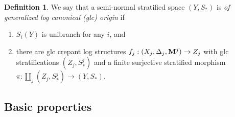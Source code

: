 \documentclass[11pt]{amsart}
\numberwithin{equation}{section}
\newcommand{\Mm}{{\bf{M}}}
\theoremstyle{definition}
\newtheorem{defn}[thm]{Definition}
\theoremstyle{definition}
\theoremstyle{definition}
\begin{document}
\begin{defn}\label{defn: of glc origin}
We say that a semi-normal stratified space $(Y,S_*)$ is \textit{of generalized log canonical (glc) origin} if 
\begin{enumerate}
    \item $S_i(Y)$ is unibranch for any $i$, and
    \item there are glc crepant log structures $f_j:(X_j,\Delta_j,\Mm^j)\to Z_j$ with glc stratifications $(Z_j,S_{*}^j)$ and a finite surjective stratified morphism $\pi: \amalg_j(Z_j,S_{*}^j)\to (Y,S_*)$.
\end{enumerate}

\end{defn}


\subsection{Basic properties}
\end{document}
